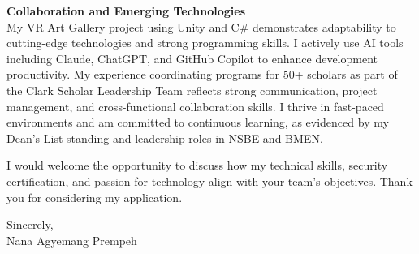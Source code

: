 \documentclass[12pt,letterpaper]{article}
\begin{document}
\textbf{Collaboration and Emerging Technologies} \\
My VR Art Gallery project using Unity and C\# demonstrates adaptability to cutting-edge technologies and strong programming skills. I actively use AI tools including Claude, ChatGPT, and GitHub Copilot to enhance development productivity. My experience coordinating programs for 50+ scholars as part of the Clark Scholar Leadership Team reflects strong communication, project management, and cross-functional collaboration skills. I thrive in fast-paced environments and am committed to continuous learning, as evidenced by my Dean's List standing and leadership roles in NSBE and BMEN.

I would welcome the opportunity to discuss how my technical skills, security certification, and passion for technology align with your team's objectives. Thank you for considering my application.

\vspace{0.5cm}
Sincerely, \\
Nana Agyemang Prempeh
\end{document}

